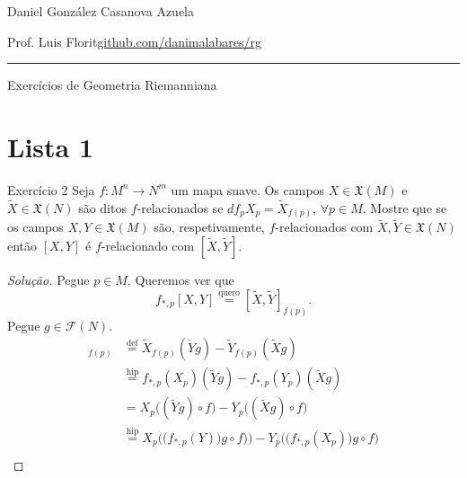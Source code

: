 
\newcommand{\rightlooparrow}{\mathbin{
    \vbox{\openup-10.25pt\halign{\hss$##$\hss\cr\circ\cr\longrightarrow\cr}}
}}




\begin{minipage}{\textwidth}
	\begin{minipage}{1\textwidth}
		\hfill Daniel González Casanova Azuela
		
		{\small Prof. Luis Florit\hfill\href{https://github.com/danimalabares/rg}{github.com/danimalabares/rg}}
	\end{minipage}
\end{minipage}\vspace{.2cm}\hrule

\vspace{10pt}
{\huge Exercícios de Geometria Riemanniana}
\tableofcontents

\section{Lista 1}

\begin{thing4}{Exercício 2}\label{exer:2}\leavevmode
	Seja \(f:M^n \to N^m\) um mapa suave. Os campos \(X \in \mathfrak{X}(M)\) e \(\tilde{X} \in \mathfrak{X}(N)\) são ditos \(f\)-relacionados se \(df_pX_p=\tilde{X}_{f(p)}\), \(\forall  p \in M\). Mostre que se os campos \(X,Y \in \mathfrak{X}(M)\) são, respetivamente, \(f\)-relacionados com \(\tilde{X},\tilde{Y} \in \mathfrak{X}(N)\) então \([X,Y]\) é \(f\)-relacionado com \([\tilde{X},\tilde{Y}]\).
\end{thing4}

\begin{proof}[Solução]\leavevmode
Pegue \(p \in M\). Queremos ver que
\[f_{*,p}[X,Y]\overset{\text{quero}}{=}[\tilde{X},\tilde{Y}]_{f(p)}.\]
Pegue \(g \in \mathcal{F}(N)\).
\begin{align*}
	[\tilde{X},\tilde{Y}]_{f(p)}&\overset{\operatorname{def}}{=}\tilde{X}_{f(p)}(\tilde{Y}g)-\tilde{Y}_{f(p)}(\tilde{X}g)\\
	&\overset{\operatorname{hip}}{=}f_{*,p}(X_p)(\tilde{Y}g)-f_{*,p}(Y_p)(\tilde{X}g)\\
	&=X_{p}\Big((\tilde{Y}g)\circ f\Big)-Y_p\Big((\tilde{X}g)\circ f\Big)\\
	&\overset{\operatorname{hip}}{=}X_p\Big(\big(f_{*,p}(Y)\big)g\circ f)\Big)-Y_p\Big(\big(f_{*,p}(X_p)\big)g \circ f\Big)\\
\end{align*}
\end{proof}




